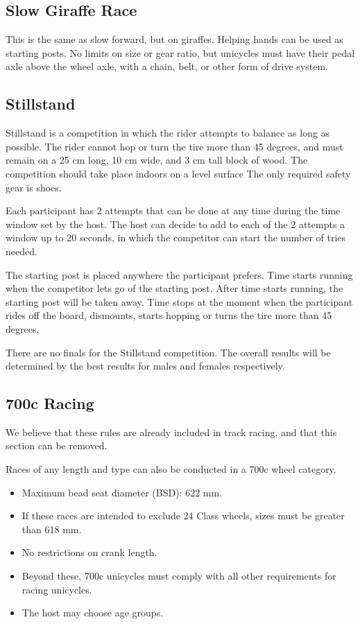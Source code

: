 \subsection{Slow Giraffe Race}

This is the same as slow forward, but on giraffes.
Helping hands can be used as starting posts.
No limits on size or gear ratio, but unicycles must have their pedal axle above the wheel axle, with a chain, belt, or other form of drive system.

\subsection{Stillstand}
Stillstand is a competition in which the rider attempts to balance as long as possible.
The rider cannot hop or turn the tire more than 45 degrees, and must remain on a 25 cm long, 10 cm wide, and 3 cm tall block of wood.
The competition should take place indoors on a level surface
The only required safety gear is shoes.

Each participant has 2 attempts that can be done at any time during the time window set by the host.
The host can decide to add to each of the 2 attempts a window up to 20 seconds, in which the competitor can start the number of tries needed.

The starting post is placed anywhere the participant prefers.
Time starts running when the competitor lets go of the starting post.
After time starts running, the starting post will be taken away.
Time stops at the moment when the participant rides off the board, dismounts, starts hopping or turns the tire more than 45 degrees.

There are no finals for the Stillstand competition.
The overall results will be determined by the best results for males and females respectively.

\subsection{700c Racing}

\begin{comment2016}
We believe that these rules are already included in track racing, and that this section can be removed.
\end{comment2016}


Races of any length and type can also be conducted in a 700c wheel category.
\begin{itemize}
\item Maximum bead seat diameter (BSD): 622 mm.
\item If these races are intended to exclude 24 Class wheels, sizes must be greater than 618 mm.
\item No restrictions on crank length.
\item Beyond these, 700c unicycles must comply with all other requirements for racing unicycles.
\item The host may choose age groups.
\end{itemize}

